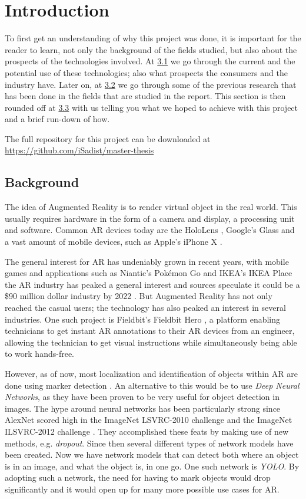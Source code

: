 \section{Introduction}
To first get an understanding of why this project was done, it is important for the reader to learn, not only the background of the fields studied, but also about the prospects of the technologies involved.
 At \hyperref[subsecBackground]{3.1} we go through the current and the potential use of these technologies; also what prospects the consumers and the industry have. Later on, at  \hyperref[subsecPrevStud]{3.2} we go through some of the previous research that has been done in the fields that are studied in the report. This section is then rounded off at \hyperref[subsecGoal]{3.3} with us telling you what we hoped to achieve with this project and a brief run-down of how.
 
 The full repository for this project can be downloaded at \url{https://github.com/iSadist/master-thesis}

\subsection{Background}
\label{subsecBackground}
The idea of Augmented Reality is to render virtual object in the real world. This usually requires hardware in the form of a camera and display, a processing unit and software. Common AR devices today are the HoloLens \cite{microsoft}, Google's Glass \cite{googleGlasses} and a vast amount of mobile devices, such as Apple's iPhone X \cite{appleAR}. 

The general interest for AR has undeniably grown in recent years, with mobile games and applications such as Niantic's Pokémon Go \cite{pokemonGO} and IKEA's IKEA Place \cite{IKEAPlace} the AR industry has peaked a general interest and sources speculate it could be a \$90 million dollar industry by 2022 \cite{digi-capital}.
 But Augmented Reality has not only reached the casual users; the technology has also peaked an interest in several industries. One such project is Fieldbit's Fieldbit Hero \cite{fieldbit}, a platform enabling technicians to get instant AR annotations to their AR devices from an engineer, allowing the technician to get visual instructions while simultaneously  being able to work hands-free. 
 
However, as of now, most localization and identification of objects within AR are done using marker detection \cite{markerDetection}. An alternative to this would be to use \textit{Deep Neural Networks}, as they have been proven to be very useful for object detection in images. The hype around neural networks has been particularly strong since AlexNet scored high in the ImageNet LSVRC-2010 challenge and the ImageNet ILSVRC-2012 challenge \cite{NIPS2012_4824}. They accomplished these feats by making use of new methods, e.g. \textit{dropout}. Since then several different types of network models have been created. Now we have network models that can detect both where an object is in an image, and what the object is, in one go. One such network is \textit{YOLO}\cite{YOLO1}. By adopting such a network, the need for having to mark objects would drop significantly and it would open up for many more possible use cases for AR.
 

